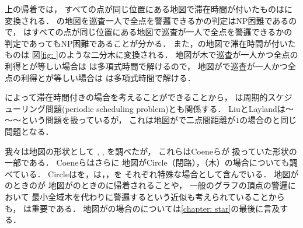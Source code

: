 上の帰着では，
すべての点が同じ位置にある地図で滞在時間が付いたものは{\graphStar}に変換される．
{\graphStar}の地図を巡査一人で全点を警邏できるかの判定はNP困難である\cite[Theorem~10]{coene2011charlemagne}ので，
{\patProbWithDuration}はすべての点が同じ位置にある地図で巡査が一人で全点を警邏できるかの判定であってもNP困難であることが分かる．
%
また，{\graphLine}の地図で滞在時間が付いたものは
図\ref{fig: }のような二分木に変換される．
地図が木で巡査が一人かつ全点の利得と{\maxIdletime}が等しい場合は
{\patProb}は多項式時間で解ける\cite[Corollary~3]{coene2011charlemagne}ので，
地図が{\graphLine}で巡査が一人かつ全点の利得と{\maxIdletime}が等しい場合は
{\patProbWithDuration}は多項式時間で解ける．

{\patProb}によって滞在時間付きの場合を考えることができることから，
{\patProb}は周期的スケジューリング問題(periodic scheduling problem)\cite{liu1973scheduling}とも関係する．
LiuとLayland\cite{liu1973scheduling}は～～～という問題を扱っているが，
これは地図が{\graphUnit}で二点間距離が$1$の場合の{\patProbWithDuration}と同じ問題となる．


我々は地図の形状として
{\graphLine}, {\graphStar}, {\graphUnit}%
を調べたが，
これらはCoeneら\cite{coene2011charlemagne}が
扱っていた形状の一部である．
Coeneらはさらに
地図がCircle（閉路），{\graphTree}（木）の場合についても調べている\cite{coene2011charlemagne}．
Circleは{\graphLine}を，{\graphTree}は{\graphLine}，{\graphStar}，{\graphUnit}を
それぞれ特殊な場合として含んでいる．
%
地図が{\graphLine}のときの{\patProbWithDuration}が
地図が{\graphTree}のときの{\patProb}に帰着されることや，
一般のグラフの頂点の警邏において
最小全域木を代わりに警邏するという近似も考えられている\cite{}ことからも，
{\graphTree}は重要である．
地図が{\graphTree}の場合の{\patProb}については\ref{chapter: star}の最後に言及する．



